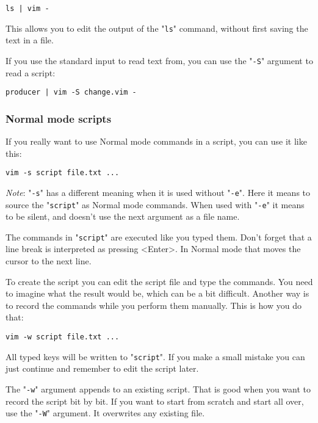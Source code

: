 \begin{Verbatim}[samepage=true]
 ls | vim -
\end{Verbatim}

This allows you to edit the output of the "\texttt{ls}" command, without first saving the text in a file.

If you use the standard input to read text from, you can use the "\texttt{-S}" argument to read a script:

\begin{Verbatim}[samepage=true]
 producer | vim -S change.vim -
\end{Verbatim}

\subsubsection{Normal mode scripts}
If you really want to use Normal mode commands in a script, you can use it like this:

\begin{Verbatim}[samepage=true]
 vim -s script file.txt ...
\end{Verbatim}
 
\emph{Note}: "\texttt{-s}" has a different meaning when it is used without "\texttt{-e}".
Here it means to source the "\texttt{script}" as Normal mode commands.
When used with "\texttt{-e}" it means to be silent, and doesn't use the next argument as a file name.

The commands in "\texttt{script}" are executed like you typed them.
Don't forget that a line break is interpreted as pressing <Enter>.
In Normal mode that moves the cursor to the next line.

To create the script you can edit the script file and type the commands.
You need to imagine what the result would be, which can be a bit difficult.
Another way is to record the commands while you perform them manually.
This is how you do that:

\begin{Verbatim}[samepage=true]
 vim -w script file.txt ...
\end{Verbatim}

All typed keys will be written to "\texttt{script}".
If you make a small mistake you can just continue and remember to edit the script later.

The "\texttt{-w}" argument appends to an existing script.
That is good when you want to record the script bit by bit.
If you want to start from scratch and start all over, use the "\texttt{-W}" argument.
It overwrites any existing file.
\clearpage
